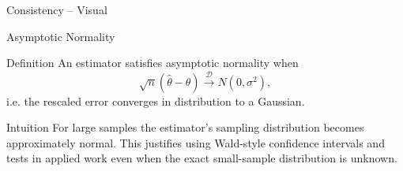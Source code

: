 \begin{frame}{Consistency -- Visual}
  \begin{center}
    \begin{adjustbox}{max height=0.40\textheight}
    \end{adjustbox}
  \end{center}
\end{frame}

\begin{frame}{Asymptotic Normality}
  \begin{block}{Definition}
    An estimator satisfies asymptotic normality when
    \[\sqrt{n}(\hat{\theta} - \theta) \xrightarrow{\;\mathcal{D}\;} N(0,\sigma^2),\]
    i.e. the rescaled error converges in distribution to a Gaussian.
  \end{block}

  \begin{block}{Intuition}
    For large samples the estimator's sampling distribution becomes approximately
    normal. This justifies using Wald-style confidence intervals and tests in
    applied work even when the exact small-sample distribution is unknown.
  \end{block}

  \vspace{1em}
  \begin{center}
  \end{center}
\end{frame}

